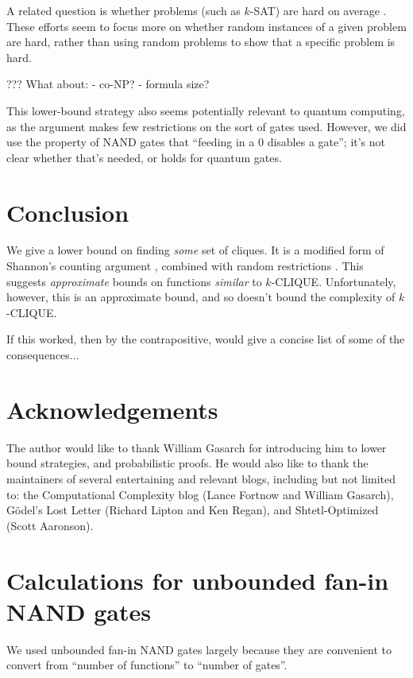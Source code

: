 \documentclass[12pt]{article}
\theoremstyle{definition}
\begin{document}
A related question is whether problems
(such as $k$-SAT) are
hard on average \cite{bogdanov2006average}.
These efforts seem to focus more on whether
random
instances of a given problem are hard, rather
than using random problems to show that
a specific problem is hard.

??? What about:
- co-NP?
- formula size?


This lower-bound strategy also seems potentially
relevant to quantum computing,
as the argument makes few restrictions on the sort of gates used.
However, we did use the property of NAND gates that ``feeding in
a 0 disables a gate''; it's not clear whether that's needed,
or holds for quantum gates.

\section{Conclusion}

We give a lower bound on finding {\em some} set of cliques.
It is a modified form of Shannon's counting argument
\cite{shannon_synthesis_1949}, combined with random restrictions
\cite{subbotovskaya1963comparison} \cite{hastad1987lower}.
This suggests {\em approximate} bounds on functions {\em similar} to $k$-CLIQUE.
Unfortunately, however, this is an approximate bound,
and so doesn't bound the complexity of $k$-CLIQUE.

If this worked, then by the contrapositive,
\cite{fenner1996complexity} would give a concise list of some of the consequences...

\section{Acknowledgements}

The author would like to thank William Gasarch for introducing him
to lower bound strategies, and probabilistic proofs.
He would also like to thank the maintainers of
several entertaining and relevant blogs, including but
not limited to: the Computational Complexity blog
(Lance Fortnow and William Gasarch), 
G\"odel's Lost Letter (Richard Lipton and Ken Regan),
and Shtetl-Optimized (Scott Aaronson). 


\appendix
\section{Calculations for unbounded fan-in NAND gates}
\label{gateMath}

We used unbounded fan-in NAND gates largely because they are
convenient to convert from ``number of functions'' to
``number of gates''.
\end{document}
